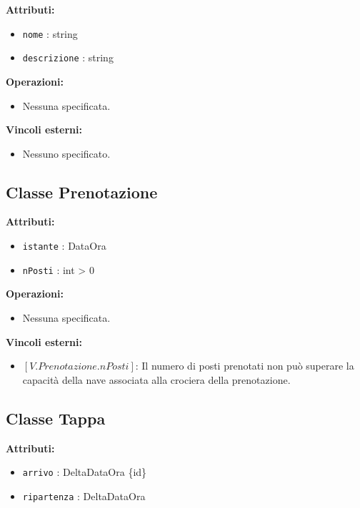 \documentclass[a4paper]{scrartcl}
\begin{document}
\textbf{Attributi:}
\begin{itemize}
    \item \texttt{nome} : string
    \item \texttt{descrizione} : string
\end{itemize}

\textbf{Operazioni:}
\begin{itemize}
    \item Nessuna specificata.
\end{itemize}

\textbf{Vincoli esterni:}
\begin{itemize}
    \item Nessuno specificato.
\end{itemize}

\subsection{Classe Prenotazione}

\textbf{Attributi:}
\begin{itemize}
    \item \texttt{istante} : DataOra
    \item \texttt{nPosti} : int > 0
\end{itemize}

\textbf{Operazioni:}
\begin{itemize}
    \item Nessuna specificata.
\end{itemize}

\textbf{Vincoli esterni:}
\begin{itemize}
    \item $[V.Prenotazione.nPosti]$: Il numero di posti prenotati non può superare la capacità della nave associata alla crociera della prenotazione.
\end{itemize}

\subsection{Classe Tappa}

\textbf{Attributi:}
\begin{itemize}
    \item \texttt{arrivo} : DeltaDataOra \{id\}
    \item \texttt{ripartenza} : DeltaDataOra
\end{itemize}
\end{document}
